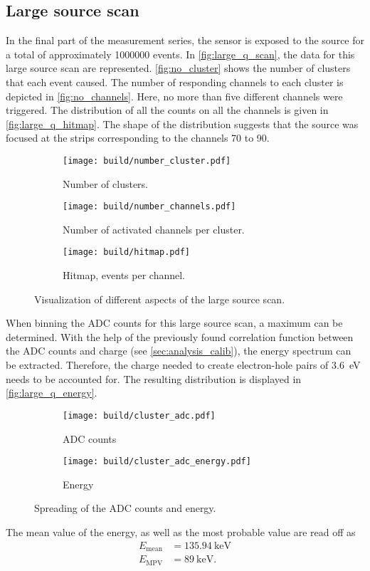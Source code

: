 \subsection{Large source scan}
\label{sec:large_q}
In the final part of the measurement series, the sensor is exposed to the source for a total of approximately \num{1000000} events. In \autoref{fig:large_q_scan}, 
the data for this large source scan are represented. \autoref{fig:no_cluster} shows the number of clusters that each event caused. The number of responding channels
to each cluster is depicted in \autoref{fig:no_channels}. Here, no more than five different channels were triggered. The distribution of all the counts on all the
channels is given in \autoref{fig:large_q_hitmap}. The shape of the distribution suggests that the source was focused at the strips corresponding to the channels
70 to 90.
\begin{figure}
    \centering
    \begin{subfigure}{0.49\textwidth}
      \texttt{[image: build/number\_cluster.pdf]}
      \caption{Number of clusters.}
      \label{fig:no_cluster}
    \end{subfigure}
    \hfill
    \begin{subfigure}{0.49\textwidth}
      \texttt{[image: build/number\_channels.pdf]}
      \caption{Number of activated channels per cluster.}
      \label{fig:no_channels}
    \end{subfigure}
    \vfill
    \begin{subfigure}{0.49\textwidth}
        \texttt{[image: build/hitmap.pdf]}
        \caption{Hitmap, events per channel.}
        \label{fig:large_q_hitmap}
      \end{subfigure}
    \caption{Visualization of different aspects of the large source scan.}
    \label{fig:large_q_scan}
  \end{figure}

  When binning the ADC counts for this large source scan, a maximum can be determined. With the help of the previously found correlation function between the 
  ADC counts and charge (see \autoref{sec:analysis_calib}), the energy spectrum can be extracted. Therefore, the charge needed to create electron-hole pairs of
  \qty{3.6}{\electronvolt} needs to be accounted for. The resulting distribution is displayed in \autoref{fig:large_q_energy}.

  \begin{figure}
    \centering
    \begin{subfigure}{0.49\textwidth}
        \texttt{[image: build/cluster\_adc.pdf]}
        \caption{ADC counts}
        \label{fig:large_q_adc}
    \end{subfigure}
    \hfill
    \begin{subfigure}{0.49\textwidth}
        \texttt{[image: build/cluster\_adc\_energy.pdf]}
        \caption{Energy}
        \label{fig:large_q_energy}
    \end{subfigure}
    \caption{Spreading of the ADC counts and energy.}
    \label{fig:large_q_adc_energy}
\end{figure}

The mean value of the energy, as well as the most probable value are read off as
\begin{align*}
    E_{\mathrm{mean}} &= \qty{135.94}{\kilo\electronvolt} \\
    E_{\mathrm{MPV}}  &= \qty{89}{\kilo\electronvolt}. \\
\end{align*}
